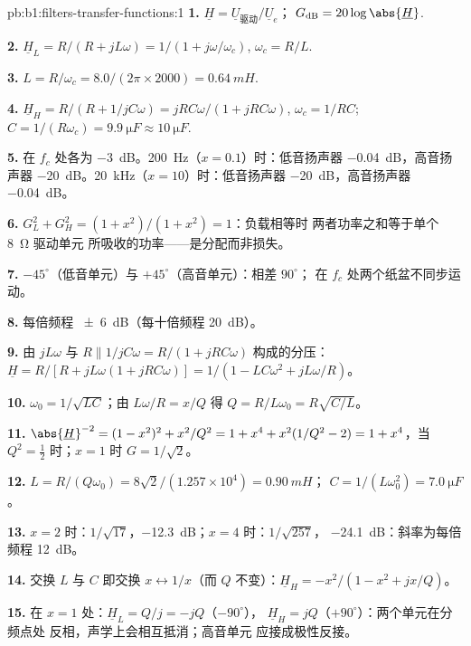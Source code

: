 \begin{solution}{pb:b1:filters-transfer-functions:1}
\textbf{1.} $\underline H = \underline U_{\text{驱动}}/\underline U_e$；
$G_{\mathrm{dB}} = 20\log\abs{\underline H}$.

\textbf{2.} $\underline H_L = R/(R + jL\omega) = 1/(1 + j\omega/\omega_c)$,
$\omega_c = R/L$.

\textbf{3.} $L = R/\omega_c = 8.0/(2\pi \times 2000) = \qty{0.64}{mH}$.

\textbf{4.} $\underline H_H = R/(R + 1/jC\omega) = jRC\omega/(1 + jRC\omega)$,
$\omega_c = 1/RC$; $C = 1/(R\omega_c) = \qty{9.9}{\micro F} \approx
\qty{10}{\micro F}$.

\textbf{5.} 在 $f_c$ 处各为 \qty{-3}{dB}。\qty{200}{Hz}（$x = 0.1$）时：低音扬声器
\qty{-0.04}{dB}，高音扬声器 \qty{-20}{dB}。\qty{20}{kHz}（$x = 10$）时：低音扬声器
\qty{-20}{dB}，高音扬声器 \qty{-0.04}{dB}。

\textbf{6.} $G_L^2 + G_H^2 = (1 + x^2)/(1 + x^2) = 1$：负载相等时
两者功率之和等于单个 \qty{8}{\ohm} 驱动单元
所吸收的功率——是分配而非损失。

\textbf{7.} $-45^\circ$（低音单元）与 $+45^\circ$（高音单元）：相差 $90^\circ$；
在 $f_c$ 处两个纸盆不同步运动。

\textbf{8.} 每倍频程 \qty{\pm 6}{dB}（每十倍频程 \qty{20}{dB}）。

\textbf{9.} 由 $jL\omega$ 与 $R \parallel 1/jC\omega =
R/(1 + jRC\omega)$ 构成的分压：$\underline H = R/[R + jL\omega(1 + jRC\omega)] =
1/(1 - LC\omega^2 + jL\omega/R)$。

\textbf{10.} $\omega_0 = 1/\sqrt{LC}$；由 $L\omega/R = x/Q$ 得 $Q =
R/L\omega_0 = R\sqrt{C/L}$。

\textbf{11.} $\abs{\underline H}^{-2} = (1 - x^2)^2 + x^2/Q^2 = 1 + x^4 +
x^2(1/Q^2 - 2) = 1 + x^4$，当 $Q^2 = \tfrac12$ 时；$x = 1$ 时 $G = 1/\sqrt2$。

\textbf{12.} $L = R/(Q\omega_0) = 8\sqrt2/(1.257\times10^4) = \qty{0.90}{mH}$；
$C = 1/(L\omega_0^2) = \qty{7.0}{\micro F}$。

\textbf{13.} $x = 2$ 时：$1/\sqrt{17}$，\qty{-12.3}{dB}；$x = 4$ 时：$1/\sqrt{257}$，
\qty{-24.1}{dB}：斜率为每倍频程 \qty{12}{dB}。

\textbf{14.} 交换 $L$ 与 $C$ 即交换 $x \leftrightarrow 1/x$（而
$Q$ 不变）：$\underline H_H = -x^2/(1 - x^2 + jx/Q)$。

\textbf{15.} 在 $x = 1$ 处：$\underline H_L = Q/j = -jQ$（$-90^\circ$），
$\underline H_H = jQ$（$+90^\circ$）：两个单元在分频点处
反相，声学上会相互抵消；高音单元
应接成极性反接。


\end{solution}
